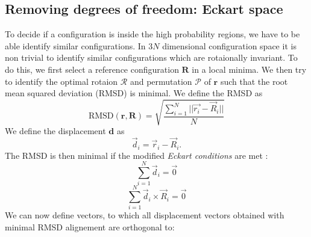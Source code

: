 \documentclass[11pt]{scrartcl} %
\begin{document}
\subsection{Removing degrees of freedom: Eckart space}
To decide if a configuration is inside the high probability regions, we have to be able identify similar configurations. In 3$N$ dimensional configuration space it is non trivial to identify similar configurations which are rotaionally invariant. To do this, we first select a reference configuration $\mathbf{R}$ in a local minima. We then try to identify the optimal rotaion $\mathcal{R}$ and permutation $\mathcal{P}$ of $\mathbf{r}$ such that the root mean squared deviation (RMSD) is minimal. We define the RMSD as
\begin{equation}
	\text{RMSD}(\mathbf{r},\mathbf{R})=\sqrt{\frac{\sum_{i=1}^N ||\vec{r_i}-\vec{R}_i||}{N}}
\end{equation}
We define the displacement $\mathbf{d}$ as
\begin{equation}
	\vec{d}_i=\vec{r}_i-\vec{R}_i.
\end{equation}
The RMSD is then minimal if the modified \emph{Eckart conditions} are met \cite{Kudin2005}:
\begin{equation}
	\sum_{i=1}^N \vec{d}_i= \vec{0}
	\label{eq:1}
\end{equation}
\begin{equation}
	\sum_{i=1}^N \vec{d}_i\times \vec{R}_i = \vec{0}
	\label{eq:2}
\end{equation}
We can now define vectors, to which all displacement vectors obtained with minimal RMSD alignement are orthogonal to:
\end{document}
